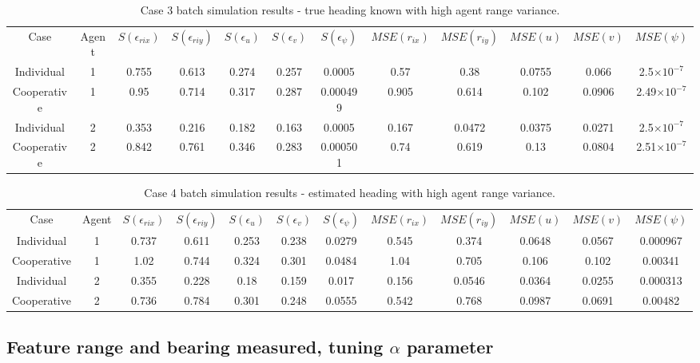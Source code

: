 \documentclass{aiaa-tc}
\begin{document}
\begin{table}[tb!]
\scriptsize
\centering
\begin{tabular}{c|c|c|c|c|c|c|c|c|c|c|c|}
Case & Agent & $S(\epsilon_{rix})$ & $S(\epsilon_{riy})$ & $S(\epsilon_{u})$ & $S(\epsilon_{v})$ & $S(\epsilon_{\psi})$ & $MSE(r_{ix})$ & $MSE(r_{iy})$ & $MSE(u)$ & $MSE(v)$ & $MSE(\psi)$ \\
Individual & 1& 0.755& 0.613& 0.274& 0.257& 0.0005& 0.57& 0.38& 0.0755& 0.066& 2.5$\times 10^{-7}$ \\
Cooperative & 1& 0.95& 0.714& 0.317& 0.287& 0.000499& 0.905& 0.614& 0.102& 0.0906& 2.49$\times 10^{-7}$ \\
Individual & 2& 0.353& 0.216& 0.182& 0.163& 0.0005& 0.167& 0.0472& 0.0375& 0.0271& 2.5$\times 10^{-7}$ \\
Cooperative & 2& 0.842& 0.761& 0.346& 0.283& 0.000501& 0.74& 0.619& 0.13& 0.0804& 2.51$\times 10^{-7}$ \\
\end{tabular}
\caption{Case 3 batch simulation results - true heading known with high agent range variance.}
\end{table}

\begin{table}[tb!]
\scriptsize
\centering
\begin{tabular}{c|c|c|c|c|c|c|c|c|c|c|c|}
Case & Agent & $S(\epsilon_{rix})$ & $S(\epsilon_{riy})$ & $S(\epsilon_{u})$ & $S(\epsilon_{v})$ & $S(\epsilon_{\psi})$ & $MSE(r_{ix})$ & $MSE(r_{iy})$ & $MSE(u)$ & $MSE(v)$ & $MSE(\psi)$ \\
Individual & 1& 0.737& 0.611& 0.253& 0.238& 0.0279& 0.545& 0.374& 0.0648& 0.0567& 0.000967 \\
Cooperative & 1& 1.02& 0.744& 0.324& 0.301& 0.0484& 1.04& 0.705& 0.106& 0.102& 0.00341 \\
Individual & 2& 0.355& 0.228& 0.18& 0.159& 0.017& 0.156& 0.0546& 0.0364& 0.0255& 0.000313 \\
Cooperative & 2& 0.736& 0.784& 0.301& 0.248& 0.0555& 0.542& 0.768& 0.0987& 0.0691& 0.00482 \\
\end{tabular}
\caption{Case 4 batch simulation results - estimated heading with high agent range variance.}
\label{tab:case4}
\end{table}

\subsection{Feature range and bearing measured, tuning $\alpha$ parameter}
\end{document}

